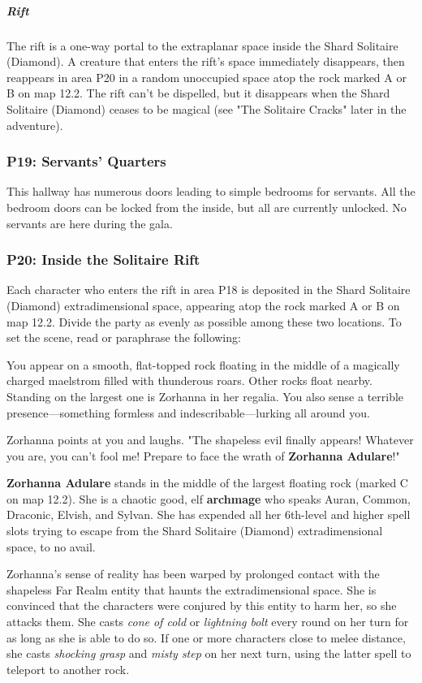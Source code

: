 \documentclass[10pt,a4paper,twoside,bg=print,twocolumn,openany,nodeprecatedcode]{dndbook}
\begin{document}
\subparagraph{Rift}
The rift is a one-way portal to the extraplanar space inside the Shard Solitaire (Diamond). A creature that enters the rift's space immediately disappears, then reappears in area P20 in a random unoccupied space atop the rock marked A or B on map 12.2. The rift can't be dispelled, but it disappears when the Shard Solitaire (Diamond) ceases to be magical (see "The Solitaire Cracks" later in the adventure).

\subsubsection{P19: Servants' Quarters}
This hallway has numerous doors leading to simple bedrooms for servants. All the bedroom doors can be locked from the inside, but all are currently unlocked. No servants are here during the gala.

\subsubsection{P20: Inside the Solitaire Rift}
Each character who enters the rift in area P18 is deposited in the Shard Solitaire (Diamond) extradimensional space, appearing atop the rock marked A or B on map 12.2. Divide the party as evenly as possible among these two locations. To set the scene, read or paraphrase the following:

\begin{DndReadAloud}{}
You appear on a smooth, flat-topped rock floating in the middle of a magically charged maelstrom filled with thunderous roars. Other rocks float nearby. Standing on the largest one is Zorhanna in her regalia. You also sense a terrible presence—something formless and indescribable—lurking all around you.

Zorhanna points at you and laughs. "The shapeless evil finally appears! Whatever you are, you can't fool me! Prepare to face the wrath of \textbf{Zorhanna Adulare}!"

\end{DndReadAloud}

\textbf{Zorhanna Adulare} stands in the middle of the largest floating rock (marked C on map 12.2). She is a chaotic good, elf \textbf{archmage} who speaks Auran, Common, Draconic, Elvish, and Sylvan. She has expended all her 6th-level and higher spell slots trying to escape from the Shard Solitaire (Diamond) extradimensional space, to no avail.

Zorhanna's sense of reality has been warped by prolonged contact with the shapeless Far Realm entity that haunts the extradimensional space. She is convinced that the characters were conjured by this entity to harm her, so she attacks them. She casts \textit{cone of cold} or \textit{lightning bolt} every round on her turn for as long as she is able to do so. If one or more characters close to melee distance, she casts \textit{shocking grasp} and \textit{misty step} on her next turn, using the latter spell to teleport to another rock.
\end{document}
